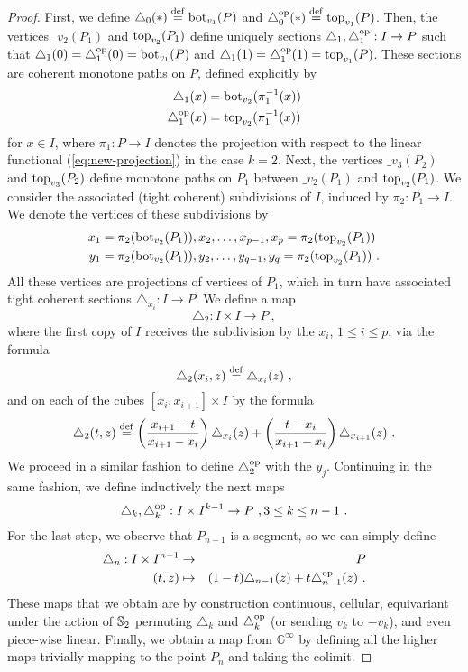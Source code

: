 \begin{proof}
	First, we define $\triangle_0 (*) \stackrel{\mathrm{def}}{=} \operatorname{bot}_{v_1}(P)$ and $\triangle_0^{\mathrm{op}} (*) \stackrel{\mathrm{def}}{=} \operatorname{top}_{v_1}(P)$.
	Then, the vertices $\bm_{v_2}(P_1)$ and $\operatorname{top}_{v_2}(P_1)$ define uniquely sections $\triangle_1, \triangle_1^{\mathrm{op}} : I \to P$ such that $\triangle_1(0)=\triangle_1^{\mathrm{op}}(0)=\operatorname{bot}_{v_1}(P)$ and $\triangle_1(1)=\triangle_1^{\mathrm{op}}(1)=\operatorname{top}_{v_1}(P)$.
	These sections are coherent monotone paths on $P$, defined explicitly by
	\begin{align*}
		\triangle_1(x) & = \operatorname{bot}_{v_2}(\pi_1^{-1}(x)) \\
		\triangle_1^{\mathrm{op}}(x) & = \operatorname{top}_{v_2}(\pi_1^{-1}(x))
	\end{align*}
	for $x \in I$, where $\pi_1 : P \to I$ denotes the projection with respect to the linear functional (\ref{eq:new-projection}) in the case $k=2$.
	Next, the vertices $\bm_{v_3}(P_2)$ and $\operatorname{top}_{v_3}(P_2)$ define monotone paths on $P_1$ between $\bm_{v_2}(P_1)$ and $\operatorname{top}_{v_2}(P_1)$.
	We consider the associated (tight coherent) subdivisions of $I$, induced by $\pi_2 : P_1 \to I$.
	We denote the vertices of these subdivisions by
	\begin{align*}
		x_1 & =\pi_2(\operatorname{bot}_{v_2}(P_1)), x_2, \ldots, x_{p-1}, x_p=\pi_2(\operatorname{top}_{v_2}(P_1)) \\
		y_1 & = \pi_2(\operatorname{bot}_{v_2}(P_1)), y_2, \ldots, y_{q-1}, y_q=\pi_2(\operatorname{top}_{v_2}(P_1)) \ .
	\end{align*}
	All these vertices are projections of vertices of $P_1$, which in turn have associated tight coherent sections $\triangle_{x_i}: I \to P$.
	We define a map
	\[
	\triangle_2 : I \times I \to P \ ,
	\]
	where the first copy of $I$ receives the subdivision by the $x_i$, $1\leq i \leq p$, via the formula
	\[
	\triangle_2(x_i, z) \stackrel{\mathrm{def}}{=} \triangle_{x_i}(z) \ ,
	\]
	and on each of the cubes $[x_i,x_{i+1}]\times I$ by the formula
	\[
	\triangle_2(t,z) \stackrel{\mathrm{def}}{=} \left( \frac{x_{i+1}-t}{x_{i+1}-x_i} \right) \triangle_{x_i}(z) + \left( \frac{t-x_i}{x_{i+1}-x_i} \right) \triangle_{x_{i+1}}(z) \ .
	\]
	We proceed in a similar fashion to define $\triangle_2^{\mathrm{op}}$ with the $y_j$.
	Continuing in the same fashion, we define inductively the next maps
	\[
	\triangle_k, \triangle_k^{\mathrm{op}} : I \times I^{k-1} \to P \ , 3 \leq k \leq n-1 \ .
	\]
	For the last step, we observe that $P_{n-1}$ is a segment, so we can simply define
	\begin{eqnarray*}
		\triangle_n : I \times I^{n-1} & \to & P \\
		(t,z) & \mapsto & (1-t)\triangle_{n-1}(z) + t \triangle_{n-1}^{\mathrm{op}} (z) \ .
	\end{eqnarray*}
	These maps that we obtain are by construction continuous, cellular, equivariant under the action of $\mathbb{S}_2$ permuting $\triangle_k$ and $\triangle_k^{\mathrm{op}}$ (or sending $v_k$ to $-v_k$), and even piece-wise linear.
	Finally, we obtain a map from $\mathbb{G}^\infty$ by defining all the higher maps trivially mapping to the point $P_n$ and taking the colimit. 
\end{proof}
